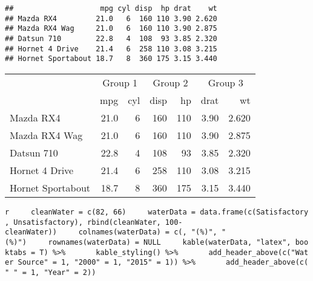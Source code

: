 \documentclass[]{article}
\newenvironment{Shaded}{\begin{snugshade}}{\end{snugshade}}
\newcommand{\KeywordTok}[1]{\textcolor[rgb]{0.13,0.29,0.53}{\textbf{#1}}}
\newcommand{\DecValTok}[1]{\textcolor[rgb]{0.00,0.00,0.81}{#1}}
\newcommand{\StringTok}[1]{\textcolor[rgb]{0.31,0.60,0.02}{#1}}
\newcommand{\OperatorTok}[1]{\textcolor[rgb]{0.81,0.36,0.00}{\textbf{#1}}}
\newcommand{\NormalTok}[1]{#1}
\begin{document}
\begin{verbatim}
##                    mpg cyl disp  hp drat    wt
## Mazda RX4         21.0   6  160 110 3.90 2.620
## Mazda RX4 Wag     21.0   6  160 110 3.90 2.875
## Datsun 710        22.8   4  108  93 3.85 2.320
## Hornet 4 Drive    21.4   6  258 110 3.08 3.215
## Hornet Sportabout 18.7   8  360 175 3.15 3.440
\end{verbatim}

\begin{Shaded}
\end{Shaded}

\begin{table}[!h]
\centering
\begin{tabular}{l|r|r|r|r|r|r}
\hline
\multicolumn{1}{c|}{ } & \multicolumn{2}{|c|}{Group 1} & \multicolumn{2}{|c|}{Group 2} & \multicolumn{2}{|c}{Group 3} \\
\cline{2-3} \cline{4-5} \cline{6-7}
  & mpg & cyl & disp & hp & drat & wt\\
\hline
Mazda RX4 & 21.0 & 6 & 160 & 110 & 3.90 & 2.620\\
\hline
Mazda RX4 Wag & 21.0 & 6 & 160 & 110 & 3.90 & 2.875\\
\hline
Datsun 710 & 22.8 & 4 & 108 & 93 & 3.85 & 2.320\\
\hline
Hornet 4 Drive & 21.4 & 6 & 258 & 110 & 3.08 & 3.215\\
\hline
Hornet Sportabout & 18.7 & 8 & 360 & 175 & 3.15 & 3.440\\
\hline
\end{tabular}
\end{table}

\texttt{r\ \ \ \ \ cleanWater\ =\ c(82,\ 66)\ \ \ \ \ waterData\ =\ data.frame(c(\textquotesingle{}Satisfactory\textquotesingle{},\ \textquotesingle{}Unsatisfactory\textquotesingle{}),\ rbind(cleanWater,\ 100-cleanWater))\ \ \ \ \ colnames(waterData)\ =\ c(\textquotesingle{}\textquotesingle{},\ "(\%)",\ "(\%)")\ \ \ \ \ rownames(waterData)\ =\ NULL\ \ \ \ \ kable(waterData,\ "latex",\ booktabs\ =\ T)\ \%\textgreater{}\%\ \ \ \ \ \ \ kable\_styling()\ \%\textgreater{}\%\ \ \ \ \ \ \ add\_header\_above(c("Water\ Source"\ =\ 1,\ "2000"\ =\ 1,\ "2015"\ =\ 1))\ \%\textgreater{}\%\ \ \ \ \ \ \ add\_header\_above(c("\ "\ =\ 1,\ "Year"\ =\ 2))}
\end{document}
